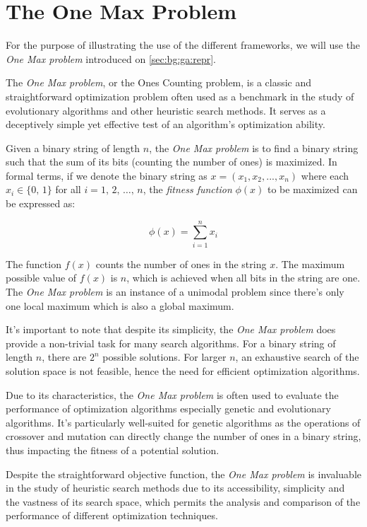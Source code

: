 \section{The One Max Problem}
\label{sota:omp}
  For the purpose of illustrating the use of the different frameworks, we will
  use the \textit{One Max problem} introduced on \vref{sec:bg:ga:repr}.

  The \emph{One Max problem}, or the Ones Counting problem, is a classic and
  straightforward optimization problem often used as a benchmark in the study of
  evolutionary algorithms and other heuristic search methods.
  It serves as a deceptively simple yet effective test of an algorithm's
  optimization ability.

  Given a binary string of length $n$, the \textit{One Max problem} is to find a
  binary string such that the sum of its bits (counting the number of ones) is
  maximized.
  In formal terms, if we denote the binary string as $x = (x_1, x_2, ..., x_n)$
  where each $x_i \in \{0,\,1\}$ for all $i = 1,\, 2,\, \dots,\, n$, the 
  \textit{fitness function} $\phi(x)$ to be maximized can be expressed as:

  \begin{equation}
    \phi(x) = \sum_{i=1}^{n} x_i
  \end{equation}

  The function $f(x)$ counts the number of ones in the string $x$.
  The maximum possible value of $f(x)$ is $n$, which is achieved when all bits
  in the string are one.
  The \textit{One Max problem} is an instance of a unimodal problem since
  there's only one local maximum which is also a global maximum.

  It's important to note that despite its simplicity, the \textit{One Max
  problem} does provide a non-trivial task for many search algorithms.
  For a binary string of length $n$, there are $2^n$ possible solutions.
  For larger $n$, an exhaustive search of the solution space is not feasible,
  hence the need for efficient optimization algorithms.

  Due to its characteristics, the \textit{One Max problem} is often used to
  evaluate the performance of optimization algorithms especially genetic and
  evolutionary algorithms.
  It's particularly well-suited for genetic algorithms as the operations of
  crossover and mutation can directly change the number of ones in a binary
  string, thus impacting the fitness of a potential solution.

  Despite the straightforward objective function, the \textit{One Max problem} is
  invaluable in the study of heuristic search methods due to its accessibility,
  simplicity and the vastness of its search space, which permits the analysis
  and comparison of the performance of different optimization techniques.
